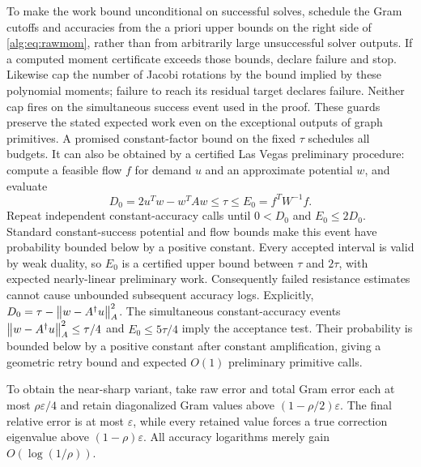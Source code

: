 To make the work bound unconditional on successful solves, schedule the
Gram cutoffs and accuracies from the a priori upper bounds on the
right side of \eqref{alg:eq:rawmom}, rather than from arbitrarily large
unsuccessful solver outputs. If a computed moment certificate exceeds
those bounds, declare failure and stop. Likewise cap the number of
Jacobi rotations by the bound implied by these polynomial moments;
failure to reach its residual target declares failure. Neither cap
fires on the simultaneous success event used in the proof. These
guards preserve the stated expected work even on the exceptional
outputs of graph primitives. A promised constant-factor bound on the
fixed $\tau$ schedules all budgets. It can also be obtained by a
certified Las Vegas preliminary procedure: compute a feasible flow
$f$ for demand $u$ and an approximate potential $w$, and evaluate
\[
 D_0=2u^Tw-w^TAw\le\tau\le E_0=f^TW^{-1}f.
\]
Repeat independent constant-accuracy calls until
$0<D_0$ and $E_0\le2D_0$. Standard constant-success potential and
flow bounds make this event have probability bounded below by a
positive constant. Every accepted interval is valid by weak duality,
so $E_0$ is a certified upper bound between $\tau$ and $2\tau$,
with expected nearly-linear preliminary work. Consequently failed
resistance estimates cannot cause unbounded subsequent accuracy logs.
Explicitly, $D_0=\tau-\left\lVert w-A^\dagger u\right\rVert_A^2$.
The simultaneous constant-accuracy events
$\left\lVert w-A^\dagger u\right\rVert_A^2\le\tau/4$ and $E_0\le5\tau/4$
imply the acceptance test. Their probability is bounded below by a
positive constant after constant amplification, giving a geometric
retry bound and expected $O(1)$ preliminary primitive calls.

To obtain the near-sharp variant, take raw error and total Gram error
each at most $\rho\varepsilon/4$ and retain diagonalized Gram values
above $(1-\rho/2)\varepsilon$. The final relative error is at most
$\varepsilon$, while every retained value forces a true correction
eigenvalue above $(1-\rho)\varepsilon$. All accuracy logarithms merely
gain $O(\log(1/\rho))$.

